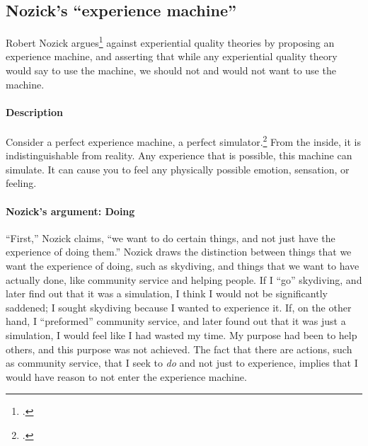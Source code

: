 \documentclass[letterpaper,11pt,twoside]{article}
\begin{document}
  \subsection*{Nozick's ``experience machine''}
    Robert Nozick argues\footcite{Nozick1977} against experiential quality theories by proposing an experience machine, and asserting that while any experiential quality theory would say to use the machine, we should not and would not want to use the machine.
    
    \paragraph{Description}
      Consider a perfect experience machine, a perfect simulator.\footcite{wiki:BrainInAVat}  From the inside, it is indistinguishable from reality.  Any experience that is possible, this machine can simulate.  It can cause you to feel any physically possible emotion, sensation, or feeling.%
      
    \paragraph{Nozick's argument: Doing}
      ``First,'' Nozick claims, ``we want to do certain things, and not just have the experience of doing them.''  Nozick draws the distinction between things that we want the experience of doing, such as skydiving, and things that we want to have actually done, like community service and helping people.  If I ``go'' skydiving, and later find out that it was a simulation, I think I would not be significantly saddened; I sought skydiving because I wanted to experience it.  If, on the other hand, I ``preformed'' community service, and later found out that it was just a simulation, I would feel like I had wasted my time.  My purpose had been to help others, and this purpose was not achieved.  The fact that there are actions, such as community service, that I seek to \emph{do} and not just to experience, implies that I would have reason to not enter the experience machine.
\end{document}
